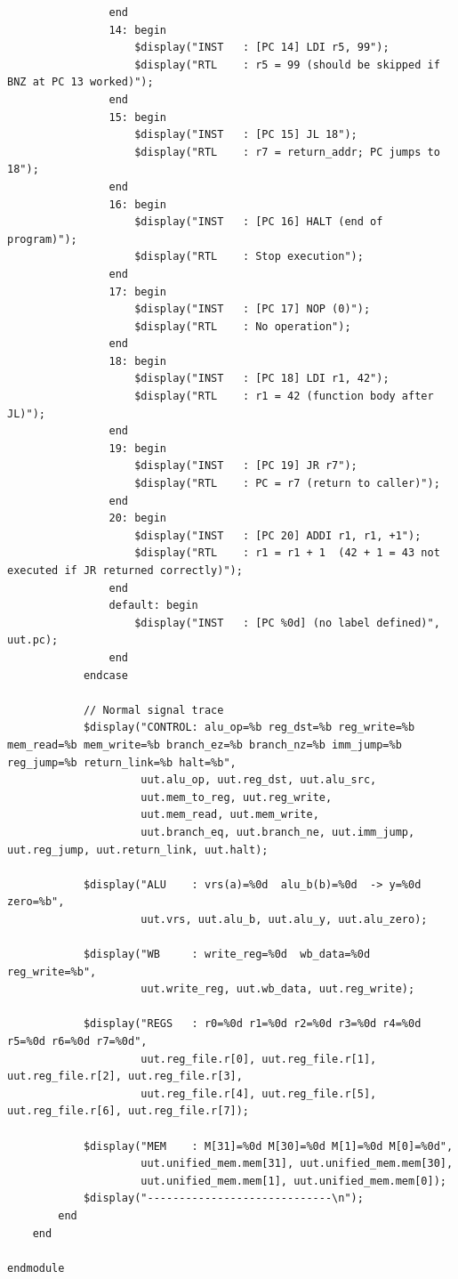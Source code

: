 \documentclass[12pt]{report}
\begin{document}
\begin{lstlisting}
                end
                14: begin
                    $display("INST   : [PC 14] LDI r5, 99");
                    $display("RTL    : r5 = 99 (should be skipped if BNZ at PC 13 worked)");
                end
                15: begin
                    $display("INST   : [PC 15] JL 18");
                    $display("RTL    : r7 = return_addr; PC jumps to 18");
                end
                16: begin
                    $display("INST   : [PC 16] HALT (end of program)");
                    $display("RTL    : Stop execution");
                end
                17: begin
                    $display("INST   : [PC 17] NOP (0)");
                    $display("RTL    : No operation");
                end
                18: begin
                    $display("INST   : [PC 18] LDI r1, 42");
                    $display("RTL    : r1 = 42 (function body after JL)");
                end
                19: begin
                    $display("INST   : [PC 19] JR r7");
                    $display("RTL    : PC = r7 (return to caller)");
                end
                20: begin
                    $display("INST   : [PC 20] ADDI r1, r1, +1");
                    $display("RTL    : r1 = r1 + 1  (42 + 1 = 43 not executed if JR returned correctly)");
                end
                default: begin
                    $display("INST   : [PC %0d] (no label defined)", uut.pc);
                end
            endcase

            // Normal signal trace
            $display("CONTROL: alu_op=%b reg_dst=%b reg_write=%b mem_read=%b mem_write=%b branch_ez=%b branch_nz=%b imm_jump=%b reg_jump=%b return_link=%b halt=%b",
                     uut.alu_op, uut.reg_dst, uut.alu_src,
                     uut.mem_to_reg, uut.reg_write,
                     uut.mem_read, uut.mem_write,
                     uut.branch_eq, uut.branch_ne, uut.imm_jump, uut.reg_jump, uut.return_link, uut.halt);

            $display("ALU    : vrs(a)=%0d  alu_b(b)=%0d  -> y=%0d  zero=%b",
                     uut.vrs, uut.alu_b, uut.alu_y, uut.alu_zero);

            $display("WB     : write_reg=%0d  wb_data=%0d  reg_write=%b",
                     uut.write_reg, uut.wb_data, uut.reg_write);

            $display("REGS   : r0=%0d r1=%0d r2=%0d r3=%0d r4=%0d r5=%0d r6=%0d r7=%0d",
                     uut.reg_file.r[0], uut.reg_file.r[1], uut.reg_file.r[2], uut.reg_file.r[3],
                     uut.reg_file.r[4], uut.reg_file.r[5], uut.reg_file.r[6], uut.reg_file.r[7]);

            $display("MEM    : M[31]=%0d M[30]=%0d M[1]=%0d M[0]=%0d",
                     uut.unified_mem.mem[31], uut.unified_mem.mem[30],
                     uut.unified_mem.mem[1], uut.unified_mem.mem[0]);
            $display("-----------------------------\n");
        end
    end

endmodule
\end{lstlisting}
\end{document}
